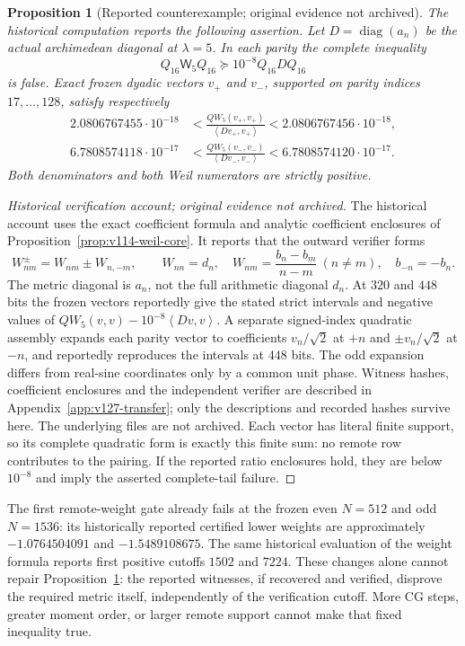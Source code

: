 \documentclass[11pt]{article}
\newtheorem{proposition}[theorem]{Proposition}
\theoremstyle{remark}
\newcommand{\ip}[2]{\left\langle #1,#2\right\rangle}
\begin{document}
\begin{proposition}[Reported counterexample; original evidence not archived]
\label{prop:v127-metric-fails}
The historical computation reports the following assertion. Let $D=\operatorname{diag}(a_n)$ be the actual archimedean diagonal
at $\lambda=5$. In each parity the complete inequality
\[
 Q_{16}\mathsf W_5Q_{16}\succeq10^{-8}Q_{16}DQ_{16}
\]
is false. Exact frozen dyadic vectors $v_+$ and $v_-$, supported on
parity indices $17,\ldots,128$, satisfy respectively
\begin{align*}
 2.0806767455\cdot10^{-18}
 &<\frac{QW_5(v_+,v_+)}{\ip{Dv_+}{v_+}}
 <2.0806767456\cdot10^{-18},\\
 6.7808574118\cdot10^{-17}
 &<\frac{QW_5(v_-,v_-)}{\ip{Dv_-}{v_-}}
 <6.7808574120\cdot10^{-17}.
\end{align*}
Both denominators and both Weil numerators are strictly positive.
\end{proposition}
\begin{proof}[Historical verification account; original evidence not archived]
The historical account uses the exact coefficient formula and analytic
coefficient enclosures of Proposition~\ref{prop:v114-weil-core}.
It reports that the outward verifier forms
\[
 W_{nm}^{\pm}=W_{nm}\pm W_{n,-m},\qquad
 W_{nn}=d_n,\quad
 W_{nm}=\frac{b_n-b_m}{n-m}\ (n\ne m),\quad b_{-n}=-b_n.
\]
The metric diagonal is $a_n$, not the full arithmetic diagonal $d_n$.
At $320$ and $448$ bits the frozen vectors reportedly give the stated strict
intervals and negative values of $QW_5(v,v)-10^{-8}\ip{Dv}{v}$.
A separate signed-index quadratic assembly expands each parity vector
to coefficients $v_n/\sqrt2$ at $+n$ and $\pm v_n/\sqrt2$ at $-n$,
and reportedly reproduces the intervals at $448$ bits. The odd expansion differs
from real-sine coordinates only by a common unit phase. Witness hashes,
coefficient enclosures and the independent verifier are described in
Appendix~\ref{app:v127-transfer}; only the descriptions and recorded
hashes survive here. The underlying files are not archived. Each vector has literal finite support,
so its complete quadratic form is exactly this finite sum: no remote
row contributes to the pairing. If the reported ratio enclosures hold,
they are below $10^{-8}$ and imply the asserted complete-tail failure.
\end{proof}

The first remote-weight gate already fails at the frozen even
$N=512$ and odd $N=1536$: its historically reported certified lower weights are approximately
$-1.0764504091$ and $-1.5489108675$. The same historical evaluation
of the weight formula reports first positive cutoffs $1502$ and $7224$.
These changes alone cannot repair Proposition~\ref{prop:v127-metric-fails}:
the reported witnesses, if recovered and verified, disprove the required
metric itself, independently of the verification cutoff. More CG steps, greater moment order, or
larger remote support cannot make that fixed inequality true.
\end{document}

